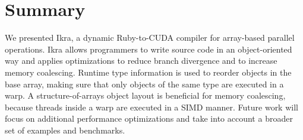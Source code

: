 \documentclass[preprint]{sigplanconf}
\begin{document}

\section{Summary}
We presented Ikra, a dynamic Ruby-to-CUDA compiler for array-based parallel operations. Ikra allows programmers to write source code in an object-oriented way and applies optimizations to reduce branch divergence and to increase memory coalescing. Runtime type information is used to reorder objects in the base array, making sure that only objects of the same type are executed in a warp. A structure-of-arrays object layout is beneficial for memory coalescing, because threads inside a warp are executed in a SIMD manner. Future work will focus on additional performance optimizations and take into account a broader set of examples and benchmarks.






\end{document}
